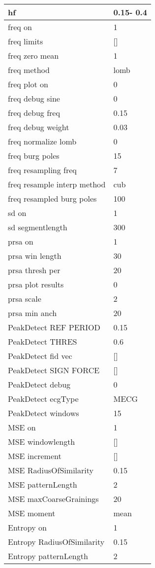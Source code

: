 \begin{tabular}{|l|l|}
hf&  0.15-   0.4\\\hline
freq on&1\\\hline
freq limits&[]\\\hline
freq zero mean&1\\\hline
freq method&lomb\\\hline
freq plot on&0\\\hline
freq debug sine&0\\\hline
freq debug freq&0.15\\\hline
freq debug weight&0.03\\\hline
freq normalize lomb&0\\\hline
freq burg poles&15\\\hline
freq resampling freq&7\\\hline
freq resample interp method&cub\\\hline
freq resampled burg poles&100\\\hline
sd on&1\\\hline
sd segmentlength&300\\\hline
prsa on&1\\\hline
prsa win length&30\\\hline
prsa thresh per&20\\\hline
prsa plot results&0\\\hline
prsa scale&2\\\hline
prsa min anch&20\\\hline
PeakDetect REF PERIOD&0.15\\\hline
PeakDetect THRES&0.6\\\hline
PeakDetect fid vec&[]\\\hline
PeakDetect SIGN FORCE&[]\\\hline
PeakDetect debug&0\\\hline
PeakDetect ecgType&MECG\\\hline
PeakDetect windows&15\\\hline
MSE on&1\\\hline
MSE windowlength&[]\\\hline
MSE increment&[]\\\hline
MSE RadiusOfSimilarity&0.15\\\hline
MSE patternLength&2\\\hline
MSE maxCoarseGrainings&20\\\hline
MSE moment&mean\\\hline
Entropy on&1\\\hline
Entropy RadiusOfSimilarity&0.15\\\hline
Entropy patternLength&2\\\hline

\end{tabular}
